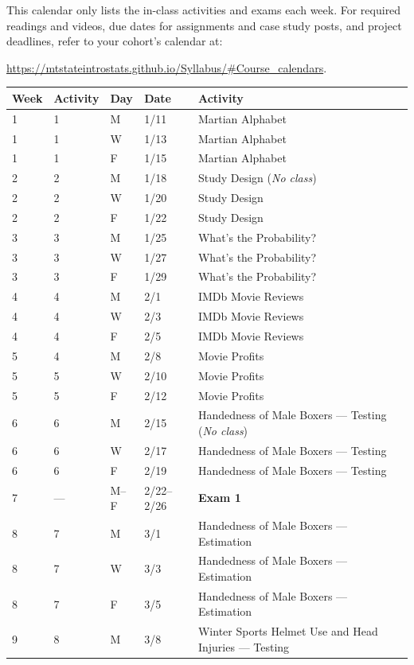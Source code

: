 \documentclass[
]{report}
\begin{document}
This calendar only lists the in-class activities and exams each week. For required readings and videos, due dates for assignments and case study posts, and project deadlines, refer to your cohort's calendar at:

\url{https://mtstateintrostats.github.io/Syllabus/\#Course_calendars}.

\begin{longtable}{|l|l|l|l|p{}|}
\hline
\textbf{Week}& \textbf{Activity}& \textbf{Day}& \textbf{Date}& \textbf{Activity} \\ \hline
\endhead
1& 1& M& 1/11& Martian Alphabet \\*
1& 1& W& 1/13& Martian Alphabet \\*
1& 1& F& 1/15& Martian Alphabet \\ \hline
2& 2& M& 1/18& Study Design (\textit{No class}) \\*
2& 2& W& 1/20& Study Design \\*
2& 2& F& 1/22& Study Design \\ \hline
3& 3& M& 1/25& What's the Probability? \\*
3& 3& W& 1/27& What's the Probability? \\*
3& 3& F& 1/29& What's the Probability? \\ \hline
4& 4& M& 2/1& IMDb Movie Reviews \\*
4& 4& W& 2/3& IMDb Movie Reviews \\*
4& 4& F& 2/5& IMDb Movie Reviews \\ \hline
5& 4& M& 2/8& Movie Profits \\*
5& 5& W& 2/10& Movie Profits \\*    
5& 5& F& 2/12& Movie Profits \\ \hline
6& 6& M& 2/15& Handedness of Male Boxers --- Testing (\textit{No class})\\*
6& 6& W& 2/17& Handedness of Male Boxers --- Testing \\*    
6& 6& F& 2/19& Handedness of Male Boxers --- Testing \\ \hline
7& ---& M--F& 2/22--2/26& \textbf{Exam 1} \\ \hline
8& 7& M& 3/1& Handedness of Male Boxers --- Estimation \\*
8& 7& W& 3/3& Handedness of Male Boxers --- Estimation \\*  
8& 7& F& 3/5& Handedness of Male Boxers --- Estimation \\ \hline
9& 8& M& 3/8& Winter Sports Helmet Use and Head Injuries --- Testing \\*

\end{longtable}
\end{document}
